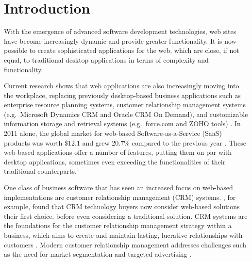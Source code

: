 \chapter{Introduction}
\label{chap:intro}

With the emergence of advanced software development technologies, web sites have become increasingly dynamic and provide greater functionality. It is now possible to create sophisticated applications for the web, which are close, if not equal, to traditional desktop applications in terms of complexity and functionality.

Current research shows that web applications are also increasingly moving into the workplace, replacing previously desktop-based business applications such as enterprise resource planning systems, customer relationship management systems (e.g.\ Microsoft Dynamics CRM and Oracle CRM On Demand), and customizable information storage and retrieval systems (e.g.\ force.com and ZOHO tools) \citep{Band2010}. In 2011 alone, the global market for web-based Software-as-a-Service (SaaS) products was worth \$12.1 and grew 20.7\% compared to the previous year \citep{Symplified2011}. These web-based applications offer a number of features, putting them on par with desktop applications, sometimes even exceeding the functionalities of their traditional counterparts.

One class of business software that has seen an increased focus on web-based implementations are customer relationship management (CRM) systems. , for example, found that CRM technology buyers now consider web-based solutions their first choice, before even considering a traditional solution. CRM systems are the foundations for the customer relationship management strategy within a business, which aims to create and maintain lasting, lucrative relationships with customers \citep{Ling2001}. Modern customer relationship management addresses challenges such as the need for market segmentation and targeted advertising \citep{Brown2000}.

